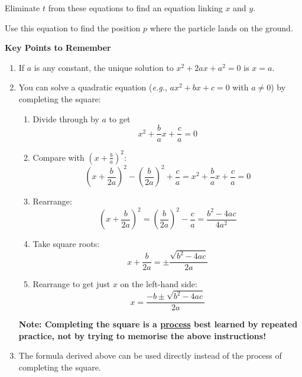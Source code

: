 \documentclass{article}
\begin{document}
Eliminate $t$ from these equations to find an equation linking $x$ and $y$.

\vspace{4cm}

Use this equation to find the position $p$ where the particle lands on the ground.


\clearpage


{\bf Key Points to Remember}

\vspace{5mm}

\begin{enumerate}
\item If $a$ is any constant, the unique solution to $x^2+2ax+a^2=0$ is $x=a$.
\item You can solve a quadratic equation (\textit{e.g.}, $ax^2+bx+c=0$ with $a\neq 0$) by completing the square:
	\begin{enumerate}
	\item Divide through by $a$ to get
	\[x^2+\frac{b}{a}x+\frac{c}{a}=0\]
	\item Compare with $\left(x+\frac{b}{a}\right)^2$:
	\[\left(x+\frac{b}{2a}\right)^2-\left(\frac{b}{2a}\right)^2+\frac{c}{a}=x^2+\frac{b}{a}x+\frac{c}{a}=0\]
	\item Rearrange:
	\[\left(x+\frac{b}{2a}\right)^2=\left(\frac{b}{2a}\right)^2-\frac{c}{a}=\frac{b^2-4ac}{4a^2}\]
	\item Take square roots:
	\[x+\frac{b}{2a}=\pm\frac{\sqrt{b^2-4ac}}{2a}\]
	\item Rearrange to get just $x$ on the left-hand side:
	\[x=\frac{-b\pm\sqrt{b^2-4ac}}{2a}\]
	\end{enumerate}
	{\bf Note: Completing the square is a \underline{process} best learned by repeated practice, not by trying to memorise the above instructions!}
\item The formula derived above can be used directly instead of the process of completing the square.
\end{enumerate}
\end{document}
